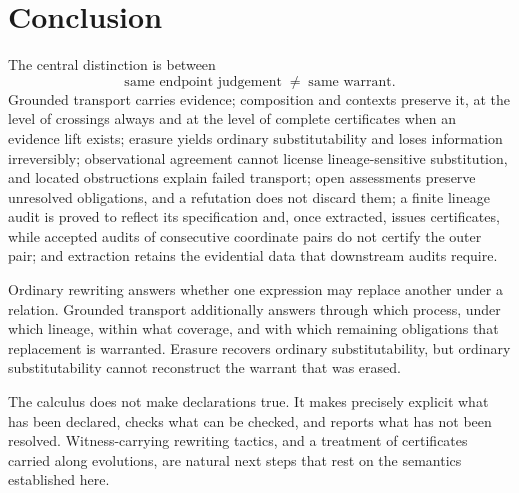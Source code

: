 \section{Conclusion}\label{sec:conclusion}

The central distinction is between
\[
\text{same endpoint judgement} \;\neq\; \text{same warrant}.
\]
Grounded transport carries evidence; composition and contexts preserve it, at the level of crossings always and at the level of complete certificates when an evidence lift exists; erasure yields ordinary substitutability and loses information irreversibly; observational agreement cannot license lineage-sensitive substitution, and located obstructions explain failed transport; open assessments preserve unresolved obligations, and a refutation does not discard them; a finite lineage audit is proved to reflect its specification and, once extracted, issues certificates, while accepted audits of consecutive coordinate pairs do not certify the outer pair; and extraction retains the evidential data that downstream audits require.

Ordinary rewriting answers whether one expression may replace another under a relation. Grounded transport additionally answers through which process, under which lineage, within what coverage, and with which remaining obligations that replacement is warranted. Erasure recovers ordinary substitutability, but ordinary substitutability cannot reconstruct the warrant that was erased.

The calculus does not make declarations true. It makes precisely explicit what has been declared, checks what can be checked, and reports what has not been resolved. Witness-carrying rewriting tactics, and a treatment of certificates carried along evolutions, are natural next steps that rest on the semantics established here.

